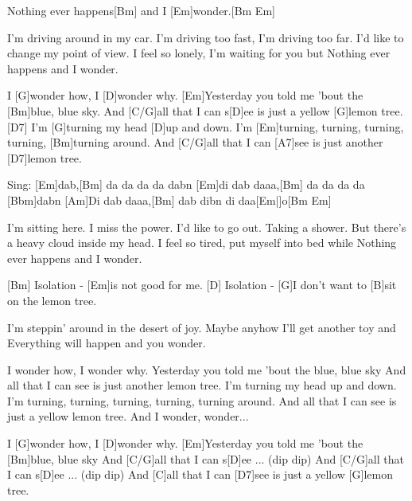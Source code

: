 \begin{guitar}
	[Am]Nothing ever happens[Bm] and I [Em]wonder.[Bm Em]{}
	
	I'm driving around in my car.
	I'm driving too fast, I'm driving too far.
	I'd like to change my point of view.
	I feel so lonely, I'm waiting for you but
	Nothing ever happens and I wonder.
	
	I [G]wonder how, I [D]wonder why. 
	[Em]Yesterday you told me 'bout the [Bm]blue, blue sky.
	And [C/G]all that I can s[D]ee is just a yellow [G]lemon tree.[D7]{}
	I'm [G]turning my head [D]up and down.
	I'm [Em]turning, turning, turning, turning, [Bm]turning around.
	And [C/G]all that I can [A7]see is just another [D7]lemon tree.
	
	Sing: [Em]dab,[Bm] da da da da dabn [Em]di dab daaa,[Bm] da da da da [Bbm]dabn
	 [Am]Di dab daaa,[Bm] dab dibn di daa[Em|]o[Bm Em]{}
	
	I'm sitting here. I miss the power.
	I'd like to go out. Taking a shower.
	But there's a heavy cloud inside my head.
	I feel so tired, put myself into bed while
	Nothing ever happens and I wonder.
	
	[Bm] Isolation - [Em]is not good for me.
	[D] Isolation - [G]I don't want to [B]sit on the lemon tree.
	
	I'm steppin' around in the desert of joy.
	Maybe anyhow I'll get another toy and
	Everything will happen and you wonder.
	
	I wonder how, I wonder why. 
	Yesterday you told me 'bout the blue, blue sky
	And all that I can see is just another lemon tree.
	I'm turning my head up and down.
	I'm turning, turning, turning, turning, turning around.
	And all that I can see is just a yellow lemon tree. And I wonder, wonder...
	
	I [G]wonder how, I [D]wonder why. 
	[Em]Yesterday you told me 'bout the [Bm]blue, blue sky
	And [C/G]all that I can s[D]ee ... (dip dip)
	And [C/G]all that I can s[D]ee ... (dip dip)
	And [C]all that I can [D7]see is just a yellow [G]lemon tree.
\end{guitar}